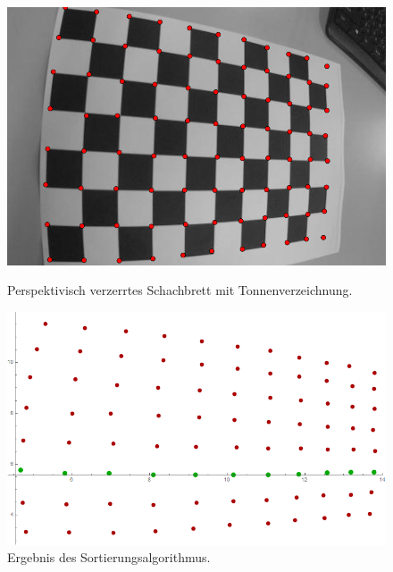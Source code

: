 \begin{figure}[!htb]
	\includegraphics[width=\linewidth]{images/Tonnenverzeichnung_Perspektivisch.png}
	\caption[Perspektivisch verzerrtes Schachbrett mit Tonnenverzeichnung]{Perspektivisch verzerrtes Schachbrett mit Tonnenverzeichnung.}
	\label{fig:Extreme7}
	\endminipage\hfill
	\includegraphics[width=\linewidth]{images/Tonnenverzeichnung_Perspektivisch_Alg.png}
	\caption[Sortierte Punkte eines perspektivisch verzerrten Schachbretts mit Tonnenverzeichnung]{Ergebnis des Sortierungsalgorithmus.}
	\label{fig:Extreme8}
	\endminipage\hfill
\end{figure}

